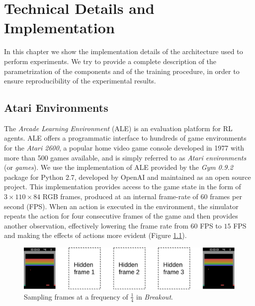 \chapter{Technical Details and Implementation}
\label{chapter5_technical_details}
\thispagestyle{empty}

\vspace{0.5cm}

In this chapter we show the implementation details of the architecture
used to perform experiments. We try to provide a complete description of the 
parametrization of the components and of the training procedure, in order to 
ensure reproducibility of the experimental results.

\section{Atari Environments}\label{s:atari_envs}
The \textit{Arcade Learning Environment} (ALE) \cite{bellemare2013arcade} is an 
evaluation platform for RL agents.
ALE offers a programmatic interface to hundreds of game environments for the 
\textit{Atari 2600}, a popular home video game console developed in 1977 with 
more than 500 games available, and is simply referred to as 
\textit{Atari environments} (or \textit{games}). 
We use the implementation of ALE provided by the \textit{Gym 0.9.2} package for 
Python 2.7, developed by OpenAI and maintained as an open source project. 
This implementation provides access to the game state in the form of 
$3 \times 110 \times 84$ RGB frames, produced at an internal frame-rate of $60$ 
frames per second (FPS).
When an action is executed in the environment, the simulator repeats the action 
for four consecutive frames of the game and then provides another observation, 
effectively lowering the frame rate from $60$ FPS to $15$ FPS and making the 
effects of actions more evident (Figure \ref{f:sampling}). 
%
\begin{figure}
    \includegraphics[width=\textwidth]{pictures/sampling}
    \centering
    \caption[Sampling frames at a frequency of $\frac{1}{4}$ in \textit{Breakout}]{
	    Sampling frames at a frequency of $\frac{1}{4}$ in \textit{Breakout}.}
    \label{f:sampling}
\end{figure}
%

